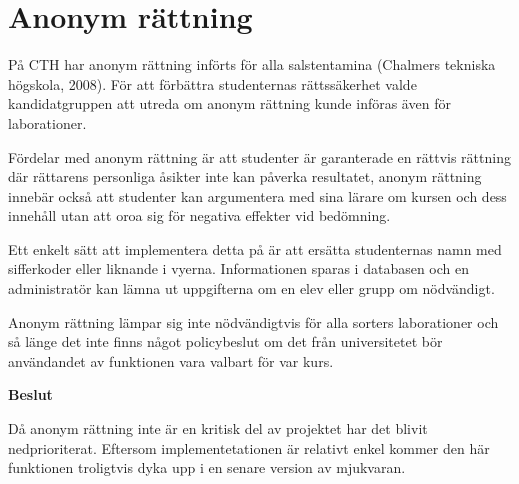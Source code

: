 \section{Anonym rättning}

På CTH har anonym rättning införts för alla salstentamina (Chalmers tekniska högskola, 2008). För att förbättra studenternas rättssäkerhet valde kandidatgruppen att utreda om anonym rättning kunde införas även för laborationer.

Fördelar med anonym rättning är att studenter är garanterade en rättvis rättning där rättarens personliga åsikter inte kan påverka resultatet, anonym rättning innebär också att studenter kan argumentera med sina lärare om kursen och dess innehåll utan att oroa sig för negativa effekter vid bedömning.

Ett enkelt sätt att implementera detta på är att ersätta studenternas namn med sifferkoder eller liknande i vyerna. Informationen sparas i databasen och en administratör kan lämna ut uppgifterna om en elev eller grupp om nödvändigt.

Anonym rättning lämpar sig inte nödvändigtvis för alla sorters laborationer och så länge det inte finns något policybeslut om det från universitetet bör användandet av funktionen vara valbart för var kurs.

\begin{flushright}

  \textbf{Beslut}

  Då anonym rättning inte är en kritisk del av projektet har det blivit nedprioriterat.
Eftersom implementetationen är relativt enkel kommer den här funktionen troligtvis dyka upp i en senare version av mjukvaran.
\end{flushright}
